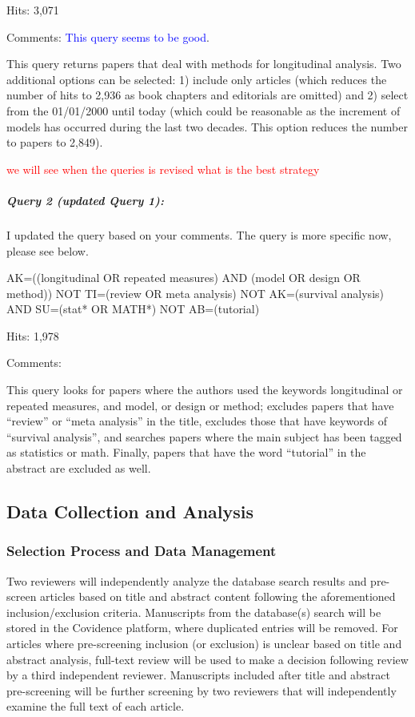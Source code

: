 \documentclass[
]{article}
\let\oldsubparagraph\subparagraph
\renewcommand{\subparagraph}[1]{\oldsubparagraph{#1}\mbox{}}
\newcommand{\BN}[1]{\textcolor{red}{#1}}
\begin{document}
Hits: 3,071

Comments: \textcolor{blue}{This query seems to be good}.

This query returns papers that deal with methods for longitudinal
analysis. Two additional options can be selected: 1) include only
articles (which reduces the number of hits to 2,936 as book chapters and
editorials are omitted) and 2) select from the 01/01/2000 until today
(which could be reasonable as the increment of models has occurred
during the last two decades. This option reduces the number to papers to
2,849).

\BN{we will see when the queries is revised what is the best strategy}

\hypertarget{query-2-updated-query-1-1}{%
\subparagraph{Query 2 (updated Query
1):}\label{query-2-updated-query-1-1}}

I updated the query based on your comments. The query is more specific
now, please see below.

AK=((longitudinal OR repeated measures) AND (model OR design OR method))
NOT TI=(review OR meta analysis) NOT AK=(survival analysis) AND
SU=(stat* OR MATH*) NOT AB=(tutorial)

Hits: 1,978

Comments:

This query looks for papers where the authors used the keywords
longitudinal or repeated measures, and model, or design or method;
excludes papers that have ``review'' or ``meta analysis'' in the title,
excludes those that have keywords of ``survival analysis'', and searches
papers where the main subject has been tagged as statistics or math.
Finally, papers that have the word ``tutorial'' in the abstract are
excluded as well.

\hypertarget{data-collection-and-analysis}{%
\subsection{Data Collection and
Analysis}\label{data-collection-and-analysis}}

\hypertarget{selection-process-and-data-management}{%
\subsubsection{Selection Process and Data
Management}\label{selection-process-and-data-management}}

Two reviewers will independently analyze the database search results and
pre-screen articles based on title and abstract content following the
aforementioned inclusion/exclusion criteria. Manuscripts from the
database(s) search will be stored in the Covidence platform, where
duplicated entries will be removed. For articles where pre-screening
inclusion (or exclusion) is unclear based on title and abstract
analysis, full-text review will be used to make a decision following
review by a third independent reviewer. Manuscripts included after title
and abstract pre-screening will be further screening by two reviewers
that will independently examine the full text of each article.
\end{document}

